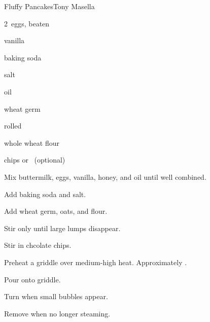 \begin{recipe}{Fluffy Pancakes}{Tony Masella}{}

\begin{ingredients}
\item {} 
\item 2~eggs, beaten
\item {} vanilla
\item {} baking soda
\item \tp{\half} salt
\item \C{\quarter} oil
\item \C{\quarter} 
\item \C{\quarter} wheat germ
\item \C{\quarter} rolled 
\item \C{1\half} whole wheat flour
\item {} chips or ~(optional)
\end{ingredients}

\begin{directions}
\item Mix buttermilk, eggs, vanilla, honey, and oil until well combined.
\item Add baking soda and salt.
\item Add wheat germ, oats, and flour.
\item Stir only until large lumps disappear.
\item Stir in chcolate chips.
\item Preheat a griddle over medium-high heat. Approximately .
\item Pour onto griddle.
\item Turn when small bubbles appear.
\item Remove when no longer steaming.
\end{directions}

\end{recipe}
